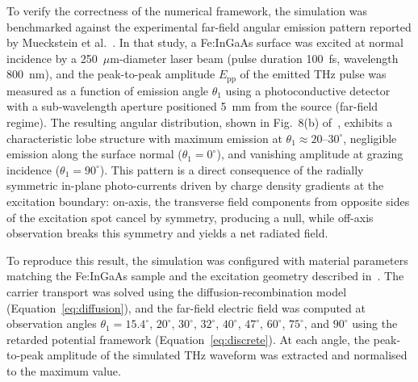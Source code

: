 \documentclass[12pt]{interim_report}
\begin{document}
To verify the correctness of the numerical framework, the simulation was benchmarked against the experimental far-field angular emission pattern reported by Mueckstein et al.~\cite{Mueckstein2015}. In that study, a Fe:InGaAs surface was excited at normal incidence by a 250~$\mu$m-diameter laser beam (pulse duration 100~fs, wavelength 800~nm), and the peak-to-peak amplitude $E_{\mathrm{pp}}$ of the emitted THz pulse was measured as a function of emission angle $\theta_1$ using a photoconductive detector with a sub-wavelength aperture positioned 5~mm from the source (far-field regime). The resulting angular distribution, shown in Fig.~8(b) of~\cite{Mueckstein2015}, exhibits a characteristic lobe structure with maximum emission at $\theta_1 \approx 20$--$30^{\circ}$, negligible emission along the surface normal ($\theta_1 = 0^{\circ}$), and vanishing amplitude at grazing incidence ($\theta_1 = 90^{\circ}$). This pattern is a direct consequence of the radially symmetric in-plane photo-currents driven by charge density gradients at the excitation boundary: on-axis, the transverse field components from opposite sides of the excitation spot cancel by symmetry, producing a null, while off-axis observation breaks this symmetry and yields a net radiated field.

To reproduce this result, the simulation was configured with material parameters matching the Fe:InGaAs sample and the excitation geometry described in~\cite{Mueckstein2015}. The carrier transport was solved using the diffusion-recombination model (Equation~\ref{eq:diffusion}), and the far-field electric field was computed at observation angles $\theta_1 = 15.4^{\circ}$, $20^{\circ}$, $30^{\circ}$, $32^{\circ}$, $40^{\circ}$, $47^{\circ}$, $60^{\circ}$, $75^{\circ}$, and $90^{\circ}$ using the retarded potential framework (Equation~\ref{eq:discrete}). At each angle, the peak-to-peak amplitude of the simulated THz waveform was extracted and normalised to the maximum value.

\end{document}
